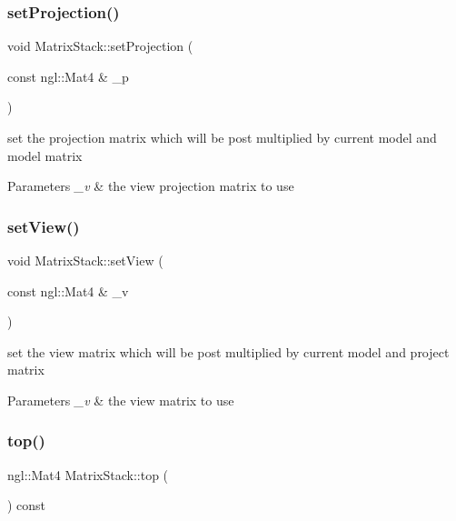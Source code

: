 \subsubsection{\texorpdfstring{set\+Projection()}{setProjection()}}
{\footnotesize\ttfamily void Matrix\+Stack\+::set\+Projection (\begin{DoxyParamCaption}\item[{const ngl\+::\+Mat4 \&}]{\+\_\+p }\end{DoxyParamCaption})\hspace{0.3cm}{\ttfamily [inline]}}



set the projection matrix which will be post multiplied by current model and model matrix 


\begin{DoxyParams}{Parameters}
{\em \+\_\+v} & the view projection matrix to use \\
\hline
\end{DoxyParams}
\mbox{\label{class_matrix_stack_a2686805de00a5db1749f4299bb01c545}} 
\subsubsection{\texorpdfstring{set\+View()}{setView()}}
{\footnotesize\ttfamily void Matrix\+Stack\+::set\+View (\begin{DoxyParamCaption}\item[{const ngl\+::\+Mat4 \&}]{\+\_\+v }\end{DoxyParamCaption})\hspace{0.3cm}{\ttfamily [inline]}}



set the view matrix which will be post multiplied by current model and project matrix 


\begin{DoxyParams}{Parameters}
{\em \+\_\+v} & the view matrix to use \\
\hline
\end{DoxyParams}
\mbox{\label{class_matrix_stack_ac1499f970a31ed52adc284143f5d6c72}} 
\subsubsection{\texorpdfstring{top()}{top()}}
{\footnotesize\ttfamily ngl\+::\+Mat4 Matrix\+Stack\+::top (\begin{DoxyParamCaption}{ }\end{DoxyParamCaption}) const\hspace{0.3cm}{\ttfamily [inline]}}



